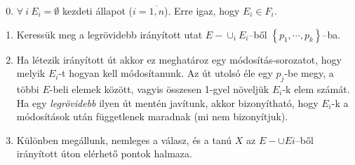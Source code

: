 \begin{enumerate}
    \setcounter{enumi}{-1}
    \item $\forall~i~E_i = \emptyset$ kezdeti állapot ($i=\overline{1,n}$). Erre
    igaz, hogy $E_i \in F_i$.
    \item Keressük meg a legrövidebb irányított utat $E-\cup_{i}E_i$--ből
    $\left\{ p_1, \cdots, p_k \right\}$--ba.
    
    \item Ha létezik irányított út akkor ez meghatároz egy módosítás-sorozatot,
    hogy melyik $E_i$-t hogyan kell módosítanunk. Az út utolsó éle egy $p_j$-be
    megy, a többi $E$-beli elemek között, vagyis összesen 1-gyel növeljük
    $E_i$-k elem számát.  Ha egy {\it legrövidebb} ilyen út mentén javítunk,
    akkor bizonyítható, hogy $E_i$-k a módosítások után függetlenek maradnak (mi
    nem bizonyítjuk).
    \item Különben megállunk, nemleges a válasz, és a tanú $X$ az $E- \cup Ei$--ből
    irányított úton elérhető pontok halmaza.
\end{enumerate} 

